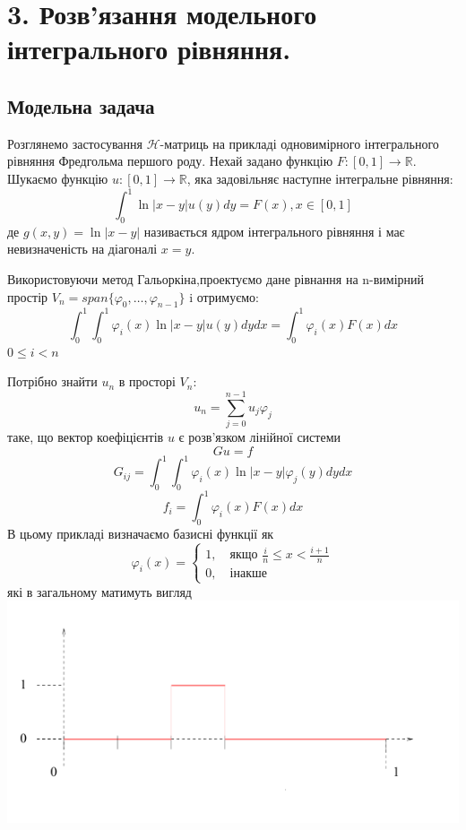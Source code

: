 \documentclass[12pt]{report}
\begin{document}
	\chapter{3. Розв'язання модельного інтегрального рівняння.}
	\section{Модельна задача}
	\hspace{0.8cm}Розглянемо застосування {$\mathcal{H}$}-матриць на прикладі одновимірного інтегрального рівняння Фредгольма першого роду. Нехай задано функцію $F:[0,1]\rightarrow \mathbb{R}$. Шукаємо функцію $u:[0,1]\rightarrow \mathbb{R}$, яка задовільняє наступне інтегральне рівняння: $$\int_{0}^{1}\ln|x-y|u(y)dy=F(x), x\in[0,1]$$
	де $g(x,y)=\ln|x-y|$ називається ядром інтегрального рівняння і має невизначеність на діагоналі $x=y$.
	\par Використовуючи метод Гальоркіна,проектуємо дане рівнання на n-вимірний простір $V_n=span\{\varphi_0,\dots,\varphi_{n-1}\}$
	i отримуємо:
	$$\int_{0}^{1}\int_{0}^{1}\varphi_i(x)\ln|x-y|u(y)dydx=\int_{0}^{1}\varphi_i(x)F(x)dx$$
	$0\le i<n$
	\par Потрібно знайти $u_n$ в просторі $V_n$:
	$$u_n=\sum_{j=0}^{n-1}u_j\varphi_j$$
	таке, що вектор коефіцієнтів $u$ є розв'язком лінійної системи $$Gu=f$$
	$$G_{ij}=\int_{0}^{1}\int_{0}^{1}\varphi_i(x)\ln|x-y|\varphi_j(y)dydx$$
	$$f_i=\int_{0}^{1}\varphi_i(x)F(x)dx$$
	 В цьому прикладі визначаємо базисні функції як
	\newline 
	\begin{equation*}
	\varphi_i(x)=\begin{cases}
			1,\quad\text{якщо $\frac{i}{n}\le x< \frac{i+1}{n}$}\\
			0,\quad\text{інакше}
				\end{cases}
	\end{equation*}
	\newline
	які в загальному матимуть вигляд 
	\newline
		\includegraphics{1_1}
\end{document}
